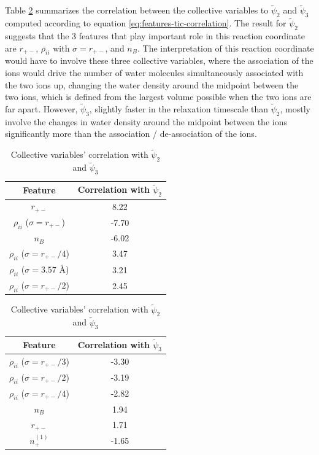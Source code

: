 \begin{spacing}{2.0}
    Table \ref{tab:features-tic-correlation} summarizes the correlation between the collective variables to $\tilde{\psi}_2$ and $\tilde{\psi}_3$ 
    computed according to equation \ref{eq:features-tic-correlation}. The result for $\tilde{\psi}_2$ suggests that the 3 features that play important 
    role in this reaction coordinate are $r_{+-}$, $\rho_{ii}$ with $\sigma = r_{+-}$, and $n_B$. The interpretation of this reaction coordinate 
    would have to involve these three collective variables, where the association of the ions would drive the number of water molecules simultaneously 
    associated with the two ions up, changing the water density around the midpoint between the two ions, which is defined from the largest volume 
    possible when the two ions are far apart. However, $\tilde{\psi}_3$, slightly faster in the relaxation timescale than $\tilde{\psi}_2$, mostly 
    involve the changes in water density around the midpoint between the ions significantly more than the association / de-association of the ions. 

    \begin{table}[t]
        \centering
        \caption{Collective variables' correlation with $\tilde{\psi}_2$ and $\tilde{\psi}_3$}\label{tab:features-tic-correlation}
        \begin{tabular}{|c|c|}
            \hline
            \textbf{Feature} & \textbf{Correlation with $\tilde{\psi}_2$} \\ \hline
            $r_{+-}$ & 8.22 \\
            $\rho_{ii}$ ($\sigma = r_{+-}$) & -7.70 \\
            $n_B$ & -6.02 \\
            $\rho_{ii}$ ($\sigma = r_{+-}/4$) & 3.47 \\
            $\rho_{ii}$ ($\sigma = 3.57$ \r{A}) & 3.21 \\
            $\rho_{ii}$ ($\sigma = r_{+-}/2$) & 2.45 \\ \hline
        \end{tabular}
        \quad\quad
        \begin{tabular}{|c|c|}
            \hline
            \textbf{Feature} & \textbf{Correlation with $\tilde{\psi}_3$} \\ \hline
            $\rho_{ii}$ ($\sigma = r_{+-}/3$) & -3.30 \\
            $\rho_{ii}$ ($\sigma = r_{+-}/2$) & -3.19 \\ 
            $\rho_{ii}$ ($\sigma = r_{+-}/4$) & -2.82 \\
            $n_B$ & 1.94 \\
            $r_{+-}$ & 1.71 \\ 
            $n_+^{(1)}$ & -1.65 \\ \hline
        \end{tabular}
    \end{table}


\end{spacing}
